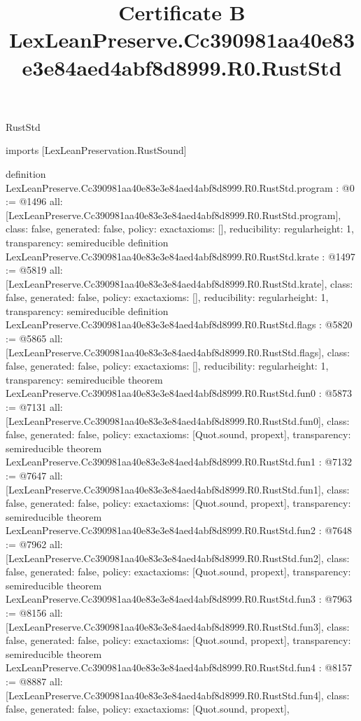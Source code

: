 \begin{lexlean}{RustStd}
\title{Certificate B LexLeanPreserve.Cc390981aa40e83e3e84aed4abf8d8999.R0.RustStd}
\begin{coremodule}
imports [LexLeanPreservation.RustSound]

definition LexLeanPreserve.Cc390981aa40e83e3e84aed4abf8d8999.R0.RustStd.program : @0 := @1496 {
  all: [LexLeanPreserve.Cc390981aa40e83e3e84aed4abf8d8999.R0.RustStd.program],
  class: false,
  generated: false,
  policy: exact{axioms: []},
  reducibility: regular{height: 1},
  transparency: semireducible
}
definition LexLeanPreserve.Cc390981aa40e83e3e84aed4abf8d8999.R0.RustStd.krate : @1497 := @5819 {
  all: [LexLeanPreserve.Cc390981aa40e83e3e84aed4abf8d8999.R0.RustStd.krate],
  class: false,
  generated: false,
  policy: exact{axioms: []},
  reducibility: regular{height: 1},
  transparency: semireducible
}
definition LexLeanPreserve.Cc390981aa40e83e3e84aed4abf8d8999.R0.RustStd.flags : @5820 := @5865 {
  all: [LexLeanPreserve.Cc390981aa40e83e3e84aed4abf8d8999.R0.RustStd.flags],
  class: false,
  generated: false,
  policy: exact{axioms: []},
  reducibility: regular{height: 1},
  transparency: semireducible
}
theorem LexLeanPreserve.Cc390981aa40e83e3e84aed4abf8d8999.R0.RustStd.fun0 : @5873 := @7131 {
  all: [LexLeanPreserve.Cc390981aa40e83e3e84aed4abf8d8999.R0.RustStd.fun0],
  class: false,
  generated: false,
  policy: exact{axioms: [Quot.sound, propext]},
  transparency: semireducible
}
theorem LexLeanPreserve.Cc390981aa40e83e3e84aed4abf8d8999.R0.RustStd.fun1 : @7132 := @7647 {
  all: [LexLeanPreserve.Cc390981aa40e83e3e84aed4abf8d8999.R0.RustStd.fun1],
  class: false,
  generated: false,
  policy: exact{axioms: [Quot.sound, propext]},
  transparency: semireducible
}
theorem LexLeanPreserve.Cc390981aa40e83e3e84aed4abf8d8999.R0.RustStd.fun2 : @7648 := @7962 {
  all: [LexLeanPreserve.Cc390981aa40e83e3e84aed4abf8d8999.R0.RustStd.fun2],
  class: false,
  generated: false,
  policy: exact{axioms: [Quot.sound, propext]},
  transparency: semireducible
}
theorem LexLeanPreserve.Cc390981aa40e83e3e84aed4abf8d8999.R0.RustStd.fun3 : @7963 := @8156 {
  all: [LexLeanPreserve.Cc390981aa40e83e3e84aed4abf8d8999.R0.RustStd.fun3],
  class: false,
  generated: false,
  policy: exact{axioms: [Quot.sound, propext]},
  transparency: semireducible
}
theorem LexLeanPreserve.Cc390981aa40e83e3e84aed4abf8d8999.R0.RustStd.fun4 : @8157 := @8887 {
  all: [LexLeanPreserve.Cc390981aa40e83e3e84aed4abf8d8999.R0.RustStd.fun4],
  class: false,
  generated: false,
  policy: exact{axioms: [Quot.sound, propext]},
}
\end{coremodule}
\end{lexlean}
